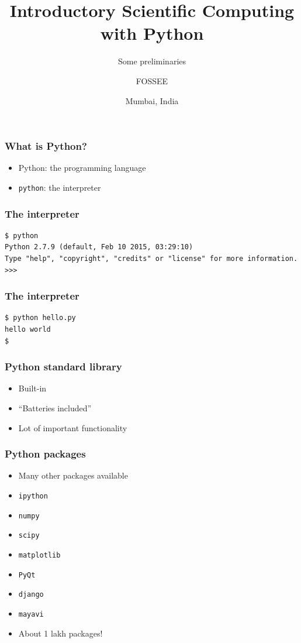 \documentclass[14pt,compress]{beamer}
\title[Introduction]{Introductory Scientific Computing with
Python}
\subtitle{Some preliminaries}
\author[FOSSEE] {FOSSEE}
\institute[IIT Bombay] {Department of Aerospace Engineering\\IIT Bombay}
\date[] {Mumbai, India
}
\newcommand{\typ}[1]{\lstinline{#1}}
\begin{document}
\begin{frame}
  \maketitle
\end{frame}

\begin{frame}[plain]
  \frametitle{What is Python?}
  \large
  \begin{itemize}
  \item Python: the programming language

    \vspace*{0.5in}
  \item \typ{python}: the interpreter
  \end{itemize}
\end{frame}

\begin{frame}[fragile]
  \frametitle{The interpreter}
  \small
  \begin{lstlisting}
$ python
Python 2.7.9 (default, Feb 10 2015, 03:29:10)
Type "help", "copyright", "credits" or "license" for more information.
>>>
\end{lstlisting} %
\end{frame}

\begin{frame}[fragile]
  \frametitle{The interpreter}
  \small
\begin{lstlisting}
$ python hello.py
hello world
$
\end{lstlisting}
\end{frame}

\begin{frame}[plain]
  \frametitle{Python standard library}
  \begin{itemize}
  \item Built-in
  \item ``Batteries included''
  \item Lot of important functionality
  \end{itemize}
\end{frame}

\begin{frame}[plain]
  \frametitle{Python packages}
  \begin{itemize}
  \item Many other packages available
  \item \typ{ipython}
  \item \typ{numpy}
  \item \typ{scipy}
  \item \typ{matplotlib}
  \item \typ{PyQt}
  \item \typ{django}
  \item \typ{mayavi}
  \item About 1 lakh packages!
  \end{itemize}
\end{frame}
\end{document}
